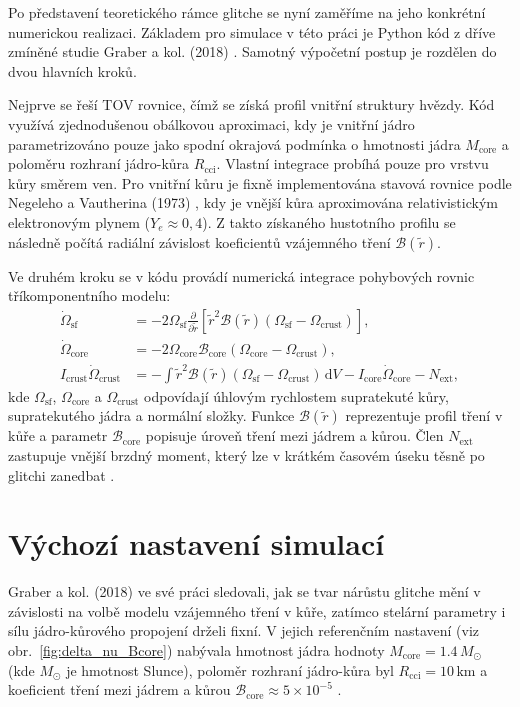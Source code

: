 \documentclass[%
final%
,htext%
]{ipothes}
\begin{document}
Po představení teoretického rámce glitche se nyní zaměříme na jeho konkrétní numerickou realizaci. Základem pro simulace v této práci je Python kód z dříve zmíněné studie Graber a kol. (2018) \cite{graber2018_code}. Samotný výpočetní postup je rozdělen do dvou hlavních kroků.

Nejprve se řeší TOV rovnice, čímž se získá profil vnitřní struktury hvězdy. Kód využívá zjednodušenou obálkovou aproximaci, kdy je vnitřní jádro parametrizováno pouze jako spodní okrajová podmínka o hmotnosti jádra $M_{\text{core}}$ a poloměru rozhraní jádro-kůra $R_{\text{cci}}$. Vlastní integrace probíhá pouze pro vrstvu kůry směrem ven. Pro vnitřní kůru je fixně implementována stavová rovnice podle Negeleho a Vautherina (1973) \cite{negele1973}, kdy je vnější kůra aproximována relativistickým elektronovým plynem ($Y_e \approx 0{,}4$). Z takto získaného hustotního profilu se následně počítá radiální závislost koeficientů vzájemného tření $\mathcal{B}(\tilde{r})$.

Ve druhém kroku se v kódu provádí numerická integrace pohybových rovnic tříkomponentního modelu:
\begin{align}
    \dot{\Omega}_{\text{sf}} &= -2\Omega_{\text{sf}}\frac{\partial}{\partial \tilde{r}}\left[\tilde{r}^2 \mathcal{B}(\tilde{r})(\Omega_{\text{sf}} - \Omega_{\text{crust}})\right],\\[2ex]
    \dot{\Omega}_{\text{core}} &= -2\Omega_{\text{core}}\mathcal{B}_{\text{core}}(\Omega_{\text{core}} - \Omega_{\text{crust}}),\\[2ex]
    I_{\text{crust}}\dot{\Omega}_{\text{crust}} &= -\int \tilde{r}^2 \mathcal{B}(\tilde{r})(\Omega_{\text{sf}} - \Omega_{\text{crust}})\, \mathrm{d}V - I_{\text{core}}\dot{\Omega}_{\text{core}} - N_{\text{ext}},
\end{align}
kde $\Omega_{\text{sf}}$, $\Omega_{\text{core}}$ a $\Omega_{\text{crust}}$ odpovídají úhlovým rychlostem supratekuté kůry, supratekutého jádra a normální složky. Funkce $\mathcal{B}(\tilde{r})$ reprezentuje profil tření v kůře a parametr $\mathcal{B}_{\text{core}}$ popisuje úroveň tření mezi jádrem a kůrou. Člen $N_{\text{ext}}$ zastupuje vnější brzdný moment, který lze v krátkém časovém úseku těsně po glitchi zanedbat \cite{graber2018}.


\section{Výchozí nastavení simulací}

Graber a kol. (2018) ve své práci sledovali, jak se tvar nárůstu glitche mění v závislosti na volbě modelu vzájemného tření v kůře, zatímco stelární parametry i sílu jádro-kůrového propojení drželi fixní. V jejich referenčním nastavení (viz obr.~\ref{fig:delta_nu_Bcore}) nabývala hmotnost jádra hodnoty $M_{\text{core}} = 1.4\,M_{\odot}$ (kde $M_{\odot}$ je hmotnost Slunce), poloměr rozhraní jádro-kůra byl $R_{\text{cci}} = 10\,\text{km}$ a koeficient tření mezi jádrem a kůrou $\mathcal{B}_{\text{core}} \approx 5\times10^{-5}$ \cite{graber2018}.
\end{document}
